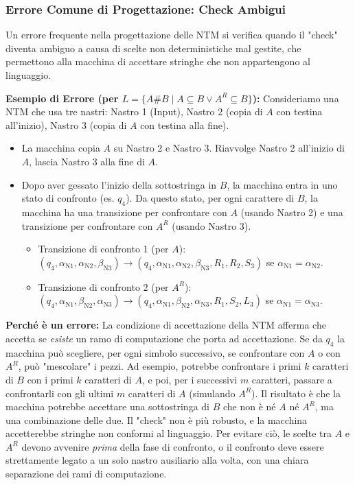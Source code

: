 \documentclass[a4paper]{article}
\begin{document}
\subsubsection{Errore Comune di Progettazione: Check Ambigui}
Un errore frequente nella progettazione delle NTM si verifica quando il "check" diventa ambiguo a causa di scelte non deterministiche mal gestite, che permettono alla macchina di accettare stringhe che non appartengono al linguaggio.

\textbf{Esempio di Errore (per $L = \{A\#B \mid A \subseteq B \lor A^R \subseteq B \}$):}
Consideriamo una NTM che usa tre nastri: Nastro 1 (Input), Nastro 2 (copia di $A$ con testina all'inizio), Nastro 3 (copia di $A$ con testina alla fine).
\begin{itemize}
    \item La macchina copia $A$ su Nastro 2 e Nastro 3. Riavvolge Nastro 2 all'inizio di $A$, lascia Nastro 3 alla fine di $A$.
    \item Dopo aver gessato l'inizio della sottostringa in $B$, la macchina entra in uno stato di confronto (es. $q_4$). Da questo stato, per ogni carattere di $B$, la macchina ha una transizione per confrontare con $A$ (usando Nastro 2) e una transizione per confrontare con $A^R$ (usando Nastro 3).
    \begin{itemize}
        \item Transizione di confronto 1 (per $A$): $(q_4, \alpha_{\text{N1}}, \alpha_{\text{N2}}, \beta_{\text{N3}}) \to (q_4, \alpha_{\text{N1}}, \alpha_{\text{N2}}, \beta_{\text{N3}}, R_1, R_2, S_3)$ se $\alpha_{\text{N1}} = \alpha_{\text{N2}}$.
        \item Transizione di confronto 2 (per $A^R$): $(q_4, \alpha_{\text{N1}}, \beta_{\text{N2}}, \alpha_{\text{N3}}) \to (q_4, \alpha_{\text{N1}}, \beta_{\text{N2}}, \alpha_{\text{N3}}, R_1, S_2, L_3)$ se $\alpha_{\text{N1}} = \alpha_{\text{N3}}$.
    \end{itemize}
\end{itemize}

\textbf{Perché è un errore:}
La condizione di accettazione della NTM afferma che accetta se \emph{esiste} un ramo di computazione che porta ad accettazione. Se da $q_4$ la macchina può scegliere, per ogni simbolo successivo, se confrontare con $A$ o con $A^R$, può "mescolare" i pezzi. Ad esempio, potrebbe confrontare i primi $k$ caratteri di $B$ con i primi $k$ caratteri di $A$, e poi, per i successivi $m$ caratteri, passare a confrontarli con gli ultimi $m$ caratteri di $A$ (simulando $A^R$). Il risultato è che la macchina potrebbe accettare una sottostringa di $B$ che non è né $A$ né $A^R$, ma una combinazione delle due. Il "check" non è più robusto, e la macchina accetterebbe stringhe non conformi al linguaggio.
Per evitare ciò, le scelte tra $A$ e $A^R$ devono avvenire \emph{prima} della fase di confronto, o il confronto deve essere strettamente legato a un solo nastro ausiliario alla volta, con una chiara separazione dei rami di computazione.
\end{document}

